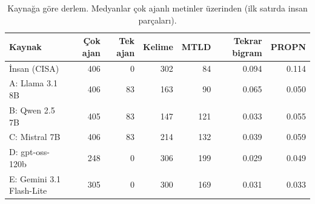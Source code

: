 \begin{table}[t]
\centering
\footnotesize
\caption{Kaynağa göre derlem. Medyanlar çok ajanlı metinler üzerinden (ilk satırda insan parçaları).}
\label{tab:data}
\begin{tabular}{lrrrrrr}
\toprule
Kaynak & Çok ajan & Tek ajan & Kelime & MTLD & Tekrar bigram & PROPN \\
\midrule
İnsan (CISA) & 406 & 0 & 302 & 84 & 0.094 & 0.114 \\
A: Llama 3.1 8B & 406 & 83 & 163 & 90 & 0.065 & 0.050 \\
B: Qwen 2.5 7B & 405 & 83 & 147 & 121 & 0.033 & 0.055 \\
C: Mistral 7B & 406 & 83 & 214 & 132 & 0.039 & 0.059 \\
D: gpt-oss-120b & 248 & 0 & 306 & 199 & 0.029 & 0.049 \\
E: Gemini 3.1 Flash-Lite & 305 & 0 & 300 & 169 & 0.031 & 0.033 \\
\bottomrule
\end{tabular}
\end{table}
